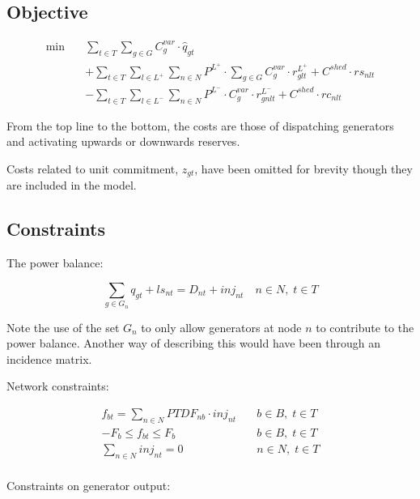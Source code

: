 \documentclass[number,times]{elsarticle}
\begin{document}
\subsection{Objective}

\begin{align}
    \min \quad & \sum_{t \in T} \sum_{g \in G} C^{var}_{g} \cdot \hat{q}_{gt} \nonumber                                                                  \\
               & + \sum_{t \in T} \sum_{l \in L^+} \sum_{n \in N} P^{L^+} \cdot \sum_{g \in G} C^{var}_{g} \cdot r^{L^+}_{glt} + C^{shed} \cdot rs_{nlt} \\
               & - \sum_{t \in T} \sum_{l \in L^-} \sum_{n \in N} P^{L^-} \cdot C^{var}_{g} \cdot r^{L^-}_{gnlt} + C^{shed} \cdot rc_{nlt} \nonumber
\end{align}

From the top line to the bottom, the costs are those of dispatching generators and activating upwards or downwards reserves.

Costs related to unit commitment, $z_{gt}$, have been omitted for brevity though they are included in the model.

\subsection{Constraints}

The power balance:

\begin{equation}
    \sum_{g \in G_n} q_{gt} + ls_{nt} = D_{nt} + inj_{nt} \quad n \in N, \; t \in T
\end{equation}

Note the use of the set $G_n$ to only allow generators at node $n$ to contribute to the power balance. Another way of describing this would have been through an incidence matrix.

Network constraints:

\begin{align}
    f_{bt} = \sum_{n \in N} PTDF_{nb} \cdot inj_{nt} & \quad b \in B, \; t \in T \\
    -F_b \leq f_{bt} \leq F_b                        & \quad b \in B, \; t \in T \\
    \sum_{n \in N} inj_{nt} = 0                      & \quad n \in N, \; t \in T \\
\end{align}

Constraints on generator output:
\end{document}
